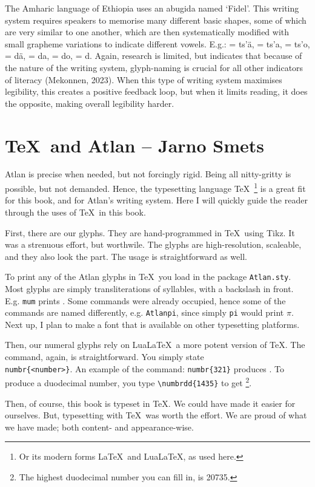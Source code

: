 The Amharic language of Ethiopia uses an abugida named ‘Fidel’. This writing system requires speakers to memorise many different basic shapes, some of which are very similar to one another, which are then systematically modified with small grapheme variations to indicate different vowels. E.g.:  = ts’\"{a},  = ts’a,  = ts’o,  = d\"{a},  = da,  = do,  = d. Again, research is limited, but indicates that because of the nature of the writing system, glyph-naming is crucial for all other indicators of literacy (Mekonnen, 2023). When this type of writing system maximises legibility, this creates a positive feedback loop, but when it limits reading, it does the opposite, making overall legibility harder.  

\section{\TeX\ and Atlan -- {\small Jarno Smets}}
Atlan is precise when needed, but not forcingly rigid. Being all nitty-gritty is possible, but not demanded. Hence, the typesetting language \TeX\ \footnote{Or its modern forms \LaTeX\ and Lua\LaTeX, as used here.} is a great fit for this book, and for Atlan's writing system. Here I will quickly guide the reader through the uses of \TeX\ in this book.

First, there are our glyphs. They are hand-programmed in \TeX\ using Tikz. It was a strenuous effort, but worthwile. The glyphs are high-resolution, scaleable, and they also look the part. The usage is straightforward as well. 

To print any of the Atlan glyphs in \TeX\, you load in the package {\tt Atlan.sty}. Most glyphs are simply transliterations of syllables, with a backslash in front. E.g. \texttt{mum} prints \mum. Some commands were already occupied, hence some of the commands are named differently, e.g. \texttt{Atlanpi}, since simply \texttt{pi} would print $\pi$. Next up, I plan to make a font that is available on other typesetting platforms. 

Then, our numeral glyphs rely on Lua\LaTeX\, a more potent version of \TeX. The command, again, is straightforward. You simply state \texttt{\\numbr\{<number>\footnotemark\}}.   An example of the command: \texttt{numbr\{321\}} produces . To produce a duodecimal number, you type \verb|\numbrdd{1435}| to get \footnote{The highest duodecimal number you can fill in, is 20735.}. 



Then, of course, this book is typeset in \TeX . We could have made it easier for ourselves. But, typesetting with \TeX\ was worth the effort. We are proud of what we have made; both content- and appearance-wise.    


\vfill
